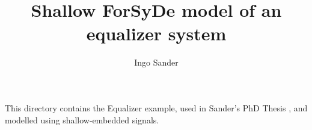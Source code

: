 \documentclass{article}
\title{Shallow ForSyDe model of an equalizer system}
\author{Ingo Sander}
\begin{document}
This directory contains the Equalizer example, used in Sander's PhD Thesis \cite{San03}, and modelled using shallow-embedded signals.











% 
% 

% 
% 

% 
% 
% 


\printbibliography
\end{document}

